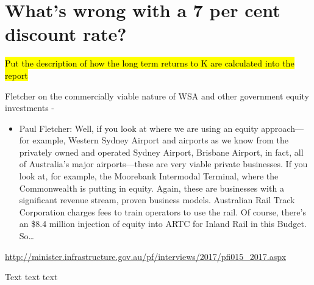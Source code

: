 \chapter{What's wrong with a 7 per cent discount rate?}\label{chap:what-is-wrong-with-seven-per-cent}


\hl{Put the description of how the long term returns to K are calculated into the report}

Fletcher on the commercially viable nature of WSA and other government equity investments - 
\begin{itemize}
    \item Paul Fletcher: Well, if you look at where we are using an equity approach—for example, Western Sydney Airport and airports as we know from the privately owned and operated Sydney Airport, Brisbane Airport, in fact, all of Australia's major airports—these are very viable private businesses. If you look at, for example, the Moorebank Intermodal Terminal, where the Commonwealth is putting in equity. Again, these are businesses with a significant revenue stream, proven business models. Australian Rail Track Corporation charges fees to train operators to use the rail. Of course, there's an \$8.4 million injection of equity into ARTC for Inland Rail in this Budget. So…
\end{itemize}
\url{http://minister.infrastructure.gov.au/pf/interviews/2017/pfi015_2017.aspx}


Text text text%
    \textcite{treasury2010link-between-fiscal-policy-and-interest-rates}